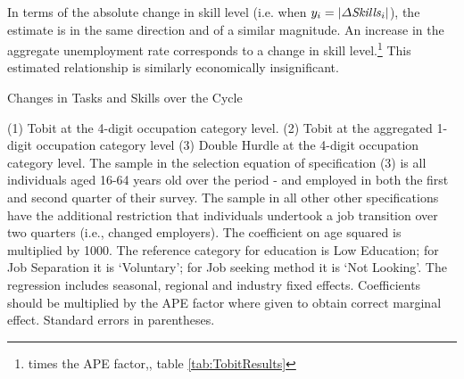 \documentclass[11pt, oneside]{article}
\begin{document}
\vspace{2mm}

In terms of the absolute change in skill level (i.e. when $y_i=|\Delta\text{\textit{Skills}}_{i}|$), the estimate is in the same direction and of a similar magnitude. An increase in the aggregate unemployment rate corresponds to a  change in skill level.\footnote{ times the APE factor,\hspace{-1mm}, table \ref{tab:TobitResults}} This estimated relationship is similarly economically insignificant.
\newpage
{}
\thispagestyle{empty}
\begin{table}[htbp]
	\centering
	\caption{Changes in Tasks and Skills over the Cycle}\label{tab:TobitResults}
	\begin{adjustbox}{width=\textwidth}
		\begin{threeparttable}
			
			
			\begin{tablenotes}
				\item{\footnotesize{(1) Tobit at the 4-digit occupation category level. (2) Tobit at the aggregated 1-digit occupation category level (3) Double Hurdle at the 4-digit occupation category level. The sample in the selection equation of specification (3) is all individuals aged 16-64 years old over the period \hspace{-1mm}-\hspace{-1mm} and employed in both the first and second quarter of their survey. The sample in all other other specifications have the additional restriction that individuals undertook a job transition over two quarters (i.e., changed employers). The coefficient on age squared is multiplied by 1000. The reference category for education is Low Education; for Job Separation it is `Voluntary';  for Job seeking method it is `Not Looking'. The regression includes seasonal, regional and industry fixed effects. Coefficients should be  multiplied by the APE factor where given to obtain correct marginal effect. Standard errors in parentheses.}}
			\end{tablenotes}
		\end{threeparttable}
	\end{adjustbox}
\end{table}
\restoregeometry %
\newpage
\end{document}
